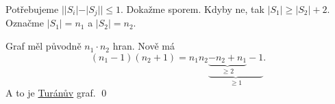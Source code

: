 Potřebujeme $||S_i| - |S_j|| \leq 1$. Dokažme sporem. Kdyby ne, tak $|S_1| \geq |S_2| + 2$. Označme $|S_1| = n_1$ a 
$|S_2| = n_2$.

Graf měl původně $n_1 \cdot n_2$ hran. Nově má
\begin{equation*}
    (n_1 - 1)(n_2 + 1) = n_1n_2 \underbrace{\underbrace{- n_2 + n_1}_{\geq 2} - 1}_{\geq 1}.
\end{equation*}
A to je \hyperref[turan]{Turánův} graf.
\hspace{\fill}\qed